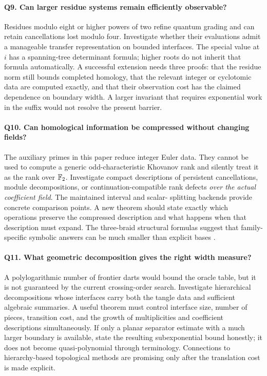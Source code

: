 \paragraph{Q9. Can larger residue systems remain efficiently observable?}
Residues modulo eight or higher powers of two refine quantum grading and can
retain cancellations lost modulo four. Investigate whether their evaluations
admit a manageable transfer representation on bounded interfaces. The special
value at $i$ has a spanning-tree determinant formula; higher roots do not
inherit that formula automatically. A successful extension needs three proofs:
that the residue norm still bounds completed homology, that the relevant
integer or cyclotomic data are computed exactly, and that their observation
cost has the claimed dependence on boundary width. A larger invariant that
requires exponential work in the suffix would not resolve the present barrier.

\paragraph{Q10. Can homological information be compressed without changing fields?}
The auxiliary primes in this paper reduce integer Euler data. They cannot be
used to compute a generic odd-characteristic Khovanov rank and silently treat
it as the rank over $\mathbb F_2$. Investigate compact descriptions of persistent
cancellations, module decompositions, or continuation-compatible rank defects
\emph{over the actual coefficient field}. The maintained interval and scalar-
splitting backends provide concrete comparison points. A new theorem should
state exactly which operations preserve the compressed description and what
happens when that description must expand. The three-braid structural formulas
suggest that family-specific symbolic answers can be much smaller than
explicit bases \cite{kelomaki}.

\paragraph{Q11. What geometric decomposition gives the right width measure?}
A polylogarithmic number of frontier darts would bound the oracle table, but
it is not guaranteed by the current crossing-order search. Investigate
hierarchical decompositions whose interfaces carry both the tangle data and
sufficient algebraic summaries. A useful theorem must control interface size,
number of pieces, transition cost, and the growth of multiplicities and
coefficient descriptions simultaneously. If only a planar separator estimate
with a much larger boundary is available, state the resulting subexponential
bound honestly; it does not become quasi-polynomial through terminology.
Connections to hierarchy-based topological methods are promising only after
the translation cost is made explicit.

